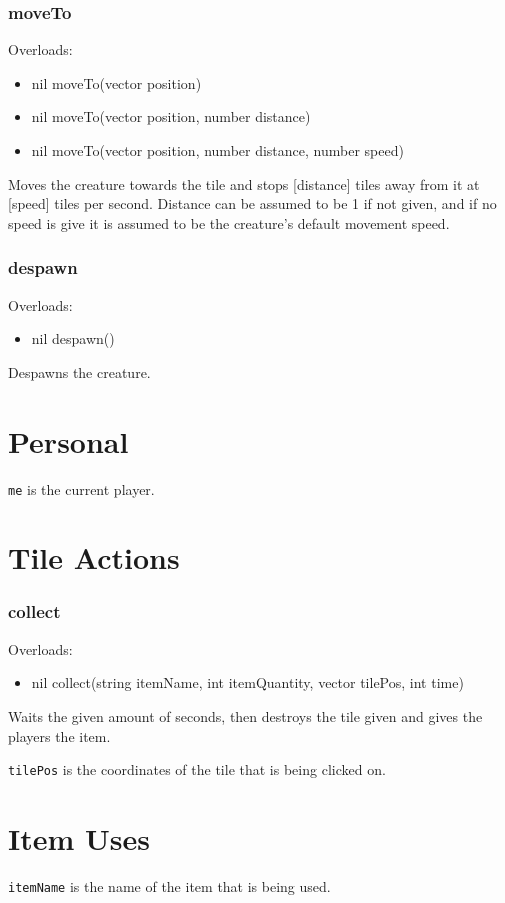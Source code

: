 \documentclass{book}
\newenvironment{ulist}
	{\begin{itemize}
			\itemsep0em}
	{\end{itemize}}
\begin{document}
\subsubsection{moveTo}
Overloads:
\begin{ulist}
	\item nil moveTo(vector position)
	\item nil moveTo(vector position, number distance)
	\item nil moveTo(vector position, number distance, number speed)
\end{ulist}
Moves the creature towards the tile and stops [distance] tiles away from it at [speed] tiles per second. Distance can be assumed to be 1 if not given, and if no speed is give it is assumed to be the creature's default movement speed.

\subsubsection{despawn}
Overloads:
\begin{ulist}
	\item nil despawn()
\end{ulist}
Despawns the creature.

\section{Personal}
\texttt{me} is the current player.

\section{Tile Actions}

\subsubsection{collect}
Overloads:
\begin{ulist}
	\item nil collect(string itemName, int itemQuantity, vector tilePos, int time)
\end{ulist}
Waits the given amount of seconds, then destroys the tile given and gives the players the item.


\texttt{tilePos} is the coordinates of the tile that is being clicked on.

\section{Item Uses}
\texttt{itemName} is the name of the item that is being used.
\end{document}
